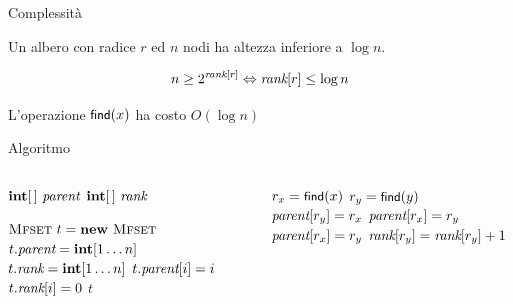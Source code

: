 \begin{frame}{Complessità}


\vspace{-9pt}
\begin{myboxtitle}[Corollario]
Un albero \mfset con radice $r$ ed $n$ nodi ha altezza inferiore a $\log n$.

\end{myboxtitle}

\begin{myboxtitle}[Dimostrazione]
\[
  n \geq 2^{\textit{rank}[r]} \Leftrightarrow \textit{rank}[r] \leq \log n
\]
\end{myboxtitle}

\begin{myboxtitle}[Complessità]
L'operazione $\textsf{{\small find}}(x)$ ha costo $O(\log n)$
\end{myboxtitle}


\end{frame}

\begin{frame}{Algoritmo}

\vspace{-15pt}
\begin{columns}[T]
\begin{Procedure}
\caption[T]{\mfset \phantom{\mfmerge($\INTEGER\ x, \INTEGER\ y$)}}	

$\INTEGER[\,]\ \mfparent$\;
$\INTEGER[\,]\ \mfrank$\;
\BlankLine

\mfset {}
{
  $\mfset\ t = \NEW\ \mfset$\;
  $t.\mfparent = \INTEGER[1 \mldots n]$\;
  $t.\mfrank = \INTEGER[1 \mldots n]$\;
  {
    $t.\textit{parent}[i] = i$\;
    $t.\textit{rank}[i] = 0$\;
  }
  \Return $t$\;
}
\end{Procedure}

\begin{Procedure}
\caption[A]{\mfmerge($\INTEGER\ x, \INTEGER\ y$)}
{
  $r_x = \textsf{{\small find}}(x)$\;
  $r_y = \textsf{{\small find}}(y)$\;
  {
    \uIf{$\mfrank[r_x] > \mfrank[r_y]$}
    {
      $\textit{parent}[r_y] = r_x$\;
    }
    \uElseIf{$\mfrank[r_y] > \mfrank[r_x]$}
    {
      $\textit{parent}[r_x] = r_y$\;
    }
    \Else
    {
      $\textit{parent}[r_x] = r_y$\;
      $\textit{rank}[r_y] = \textit{rank}[r_y]+1$
    }
  }
}
\end{Procedure}
\end{columns}

\end{frame}

